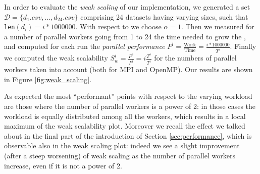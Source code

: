 \documentclass{article}
\begin{document}
In order to evaluate the \emph{weak scaling} of our implementation, we generated
a set $\mathcal{D} = \{d_1.csv, \dots, d_{24}.csv\}$ comprising 24 datasets
having varying sizes, such that \texttt{len}$(d_i) = i * 1000000$. With respect
to \cite[Chapter~5.3.2]{hager2010introduction} we choose $\alpha = 1$. Then we
measured for a number of parallel workers going from 1 to 24 the time needed to
grow the \kdtree{}, and computed for each run the \emph{parallel performance}
$P^i = \frac{\text{Work}}{\text{Time}} = \frac{i * 1000000}{T^i}$. Finally we
computed the weak scalability $S_w^i = \frac{P^s}{P^i} = i \frac{T^s}{T^i}$ for
the numbers of parallel workers taken into account (both for MPI and OpenMP).
Our results are shown in Figure \ref{fig:weak_scaling}.

As expected the most ``performant'' points with respect to the varying workload
are those where the number of parallel workers is a power of 2: in those cases
the workload is equally distributed among all the workers, which results in a
local maximum of the weak scalability plot. Moreover we recall the effect we
talked about in the final part of the introduction of Section
\ref{sec:performance}, which is observable also in the weak scaling plot: indeed
we see a slight improvement (after a steep worsening) of weak scaling as the
number of parallel workers increase, even if it is not a power of 2.
\end{document}
